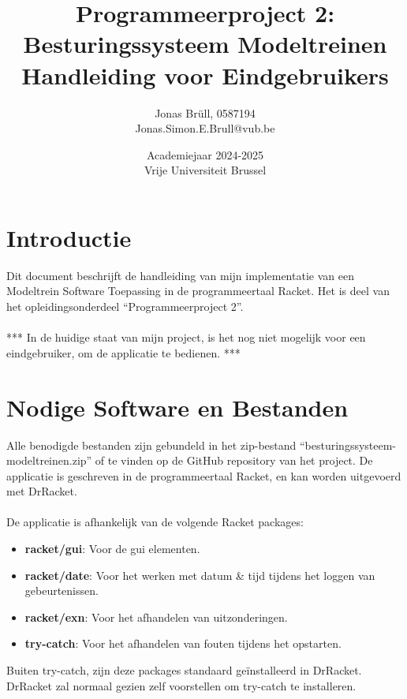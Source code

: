 \documentclass[a4paper, 11pt]{article}
\title{Programmeerproject 2: Besturingssysteem Modeltreinen\\ Handleiding voor Eindgebruikers}
\author{Jonas Br\"ull, 0587194\\ Jonas.Simon.E.Brull@vub.be\\}
\date{Academiejaar 2024-2025\\Vrije Universiteit Brussel}
\newcommand{\<}{\scriptsize\textless\normalsize}
\renewcommand{\>}{\scriptsize\textgreater\normalsize}
\begin{document}
\maketitle
\newpage

\tableofcontents
\newpage

\pagestyle{fancy}
\setcounter{page}{1}

\section{Introductie} %
Dit document beschrijft de handleiding van mijn implementatie van een Modeltrein Software Toepassing in de programmeertaal Racket. Het is deel van het opleidingsonderdeel ``Programmeerproject 2''.\\\\
*** In de huidige staat van mijn project, is het nog niet mogelijk voor een eindgebruiker, om de applicatie te bedienen. ***

\newpage
\section{Nodige Software en Bestanden} %
Alle benodigde bestanden zijn gebundeld in het zip-bestand ``besturingssysteem-modeltreinen.zip'' of te vinden op de GitHub repository van het project. De applicatie is geschreven in de programmeertaal Racket, en kan worden uitgevoerd met DrRacket.\\\\
De applicatie is afhankelijk van de volgende Racket packages:
\begin{itemize}
  \item \textbf{racket/gui}:  Voor de gui elementen.
  \item \textbf{racket/date}: Voor het werken met datum \& tijd tijdens het loggen van gebeurtenissen. 
  \item \textbf{racket/exn}:  Voor het afhandelen van uitzonderingen.
  \item \textbf{try-catch}:   Voor het afhandelen van fouten tijdens het opstarten. 
\end{itemize}
Buiten try-catch, zijn deze packages standaard geïnstalleerd in DrRacket. DrRacket zal normaal gezien zelf voorstellen om try-catch te installeren.\\
\end{document}
